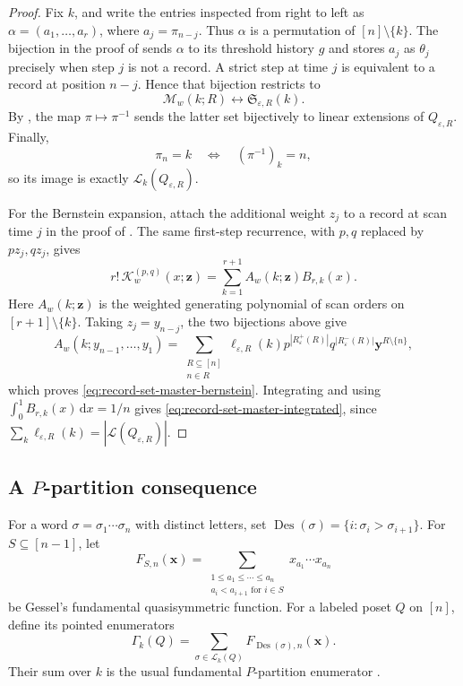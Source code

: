 \documentclass[10pt,a4paper]{amsart}
\newcommand{\dd}{\,\mathrm{d}}
\newcommand{\eps}{\varepsilon}
\begin{document}
\begin{proof}
Fix \(k\), and write the entries inspected from right to left as
\(\alpha=(a_1,\ldots,a_r)\), where \(a_j=\pi_{n-j}\).  Thus \(\alpha\) is a
permutation of \([n]\setminus\{k\}\).  The bijection in the proof of
 sends \(\alpha\) to its threshold history
\(g\) and stores \(a_j\) as \(\theta_j\) precisely when step \(j\) is not a
record.  A strict step at time \(j\) is equivalent to a record at position
\(n-j\).  Hence that bijection restricts to
\[
\mathcal M_w(k;R)\longleftrightarrow\mathfrak S_{\eps,R}(k).
\]
By , the map
\(\pi\mapsto\pi^{-1}\) sends the latter set bijectively to linear extensions
of \(Q_{\eps,R}\).  Finally,
\[
\pi_n=k\quad\Longleftrightarrow\quad (\pi^{-1})_k=n,
\]
so its image is exactly \(\mathcal L_k(Q_{\eps,R})\).

For the Bernstein expansion, attach the additional weight \(z_j\) to a
record at scan time \(j\) in the proof of
.  The same first-step recurrence, with
\(p,q\) replaced by \(pz_j,qz_j\), gives
\[
r!\,\mathscr K_w^{(p,q)}(x;\mathbf z)
 =\sum_{k=1}^{r+1}A_w(k;\mathbf z)B_{r,k}(x).
\]
Here \(A_w(k;\mathbf z)\) is the weighted generating polynomial of scan
orders on \([r+1]\setminus\{k\}\).  Taking \(z_j=y_{n-j}\), the two
bijections above give
\[
A_w(k;y_{n-1},\ldots,y_1)
 =\sum_{\substack{R\subseteq[n]\\n\in R}}
 \ell_{\eps,R}(k)
 p^{|R_\eps^+(R)|}q^{|R_\eps^-(R)|}
 \mathbf y^{R\setminus\{n\}},
\]
which proves \eqref{eq:record-set-master-bernstein}.  Integrating and using
\(\int_0^1B_{r,k}(x)\dd x=1/n\) gives
\eqref{eq:record-set-master-integrated}, since
\(\sum_k\ell_{\eps,R}(k)=|\mathcal L(Q_{\eps,R})|\).
\end{proof}


\subsection{A \texorpdfstring{\(P\)}{P}-partition consequence}
\label{sec:qsym-record-lift}

For a word \(\sigma=\sigma_1\cdots\sigma_n\) with distinct letters, set
\(\operatorname{Des}(\sigma)=\{i:\sigma_i>\sigma_{i+1}\}\).  For
\(S\subseteq[n-1]\), let
\[
F_{S,n}(\mathbf x)
=
\sum_{\substack{1\le a_1\le\cdots\le a_n\\
                 a_i<a_{i+1}\text{ for }i\in S}}
x_{a_1}\cdots x_{a_n}
\]
be Gessel's fundamental quasisymmetric function.  For a labeled poset \(Q\)
on \([n]\), define its pointed enumerators
\[
\Gamma_k(Q)=
\sum_{\sigma\in\mathcal L_k(Q)}
F_{\operatorname{Des}(\sigma),n}(\mathbf x).
\]
Their sum over \(k\) is the usual fundamental \(P\)-partition enumerator
\cite{StanleyPPartitions,Gessel1984}.
\end{document}
